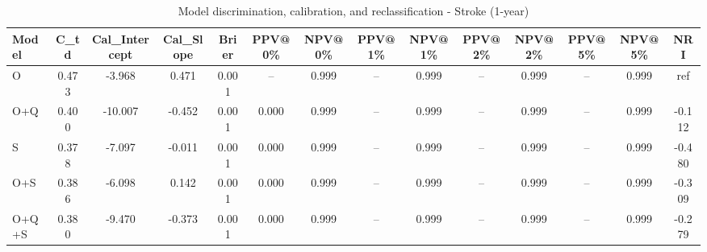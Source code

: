 \begin{table}[htbp]
\centering
\small
\caption{Model discrimination, calibration, and reclassification - Stroke (1-year)}
\label{tab:perf_stroke_1y}
\begin{tabular}{lccccccccccccc}
\toprule
Model & C\_td & Cal\_Intercept & Cal\_Slope & Brier & PPV@0\% & NPV@0\% & PPV@1\% & NPV@1\% & PPV@2\% & NPV@2\% & PPV@5\% & NPV@5\% & NRI \\
\midrule
O & 0.473 & -3.968 & 0.471 & 0.001 & -- & 0.999 & -- & 0.999 & -- & 0.999 & -- & 0.999 & ref \\
O+Q & 0.400 & -10.007 & -0.452 & 0.001 & 0.000 & 0.999 & -- & 0.999 & -- & 0.999 & -- & 0.999 & -0.112 \\
S & 0.378 & -7.097 & -0.011 & 0.001 & 0.000 & 0.999 & -- & 0.999 & -- & 0.999 & -- & 0.999 & -0.480 \\
O+S & 0.386 & -6.098 & 0.142 & 0.001 & 0.000 & 0.999 & -- & 0.999 & -- & 0.999 & -- & 0.999 & -0.309 \\
O+Q+S & 0.380 & -9.470 & -0.373 & 0.001 & 0.000 & 0.999 & -- & 0.999 & -- & 0.999 & -- & 0.999 & -0.279 \\
\bottomrule
\end{tabular}
\end{table}